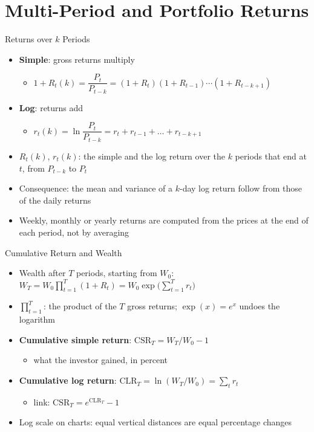 \section{Multi-Period and Portfolio Returns}

\begin{frame}{Returns over $k$ Periods}
\itemsize{\small}
\begin{itemize}
    \item \textbf{Simple}: gross returns multiply
    \begin{itemize}
        \item $1 + R_t(k) = \dfrac{P_t}{P_{t-k}} = (1 + R_t)(1 + R_{t-1}) \cdots (1 + R_{t-k+1})$
    \end{itemize}
    \item \textbf{Log}: returns add
    \begin{itemize}
        \item $r_t(k) = \ln\dfrac{P_t}{P_{t-k}} = r_t + r_{t-1} + \dots + r_{t-k+1}$
    \end{itemize}
    \item $R_t(k)$, $r_t(k)$: the simple and the log return over the $k$ periods that end at $t$, from $P_{t-k}$ to $P_t$
    \item Consequence: the mean and variance of a $k$-day log return follow from those of the daily returns
    \item Weekly, monthly or yearly returns are computed from the prices at the end of each period, not by averaging
\end{itemize}
\end{frame}

\begin{frame}{Cumulative Return and Wealth}
\itemsize{\small}
\begin{itemize}
    \item Wealth after $T$ periods, starting from $W_0$: $W_T = W_0 \prod_{t=1}^{T} (1 + R_t) = W_0 \exp\Big(\sum_{t=1}^{T} r_t\Big)$
    \item $\prod_{t=1}^{T}$: the product of the $T$ gross returns; $\exp(x) = e^x$ undoes the logarithm
    \item \textbf{Cumulative simple return}: $\text{CSR}_T = W_T/W_0 - 1$
    \begin{itemize}
        \item what the investor gained, in percent
    \end{itemize}
    \item \textbf{Cumulative log return}: $\text{CLR}_T = \ln(W_T/W_0) = \sum_t r_t$
    \begin{itemize}
        \item link: $\text{CSR}_T = e^{\text{CLR}_T} - 1$
    \end{itemize}
    \item Log scale on charts: equal vertical distances are equal percentage changes
\end{itemize}
\end{frame}

